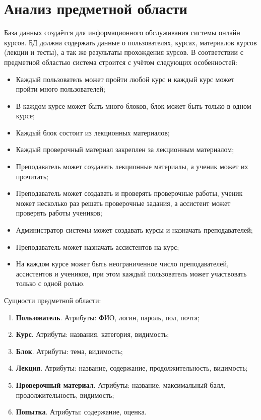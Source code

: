 \documentclass[a4paper,14pt]{article}
\begin{document}

\tableofcontents
\pagebreak

\section{Анализ предметной области}

База данных создаётся для информационного обслуживания системы онлайн курсов.
БД должна содержать данные о пользователях, курсах, материалов курсов (лекции и тесты), а так же результаты прохождения курсов.
В соответствии с предметной областью система строится с учётом следующих особенностей:

\begin{itemize}
	\item Каждый пользователь может пройти любой курс и каждый курс может пройти много пользователей;
	\item В каждом курсе может быть много блоков, блок может быть только в одном курсе;
	\item Каждый блок состоит из лекционных материалов;
	\item Каждый проверочный материал закреплен за лекционным материалом;
	\item Преподаватель может создавать лекционные материалы, а ученик может их прочитать;
	\item Преподаватель может создавать и проверять проверочные работы, ученик может несколько раз решать проверочные задания, а ассистент может проверять работы учеников;
	\item Администратор системы может создавать курсы и назначать преподавателей;
	\item Преподаватель может назначать ассистентов на курс;
	\item На каждом курсе может быть неограниченное число преподавателей, ассистентов и учеников, при этом каждый пользователь может участвовать только с одной ролью.	
\end{itemize}

Сущности предметной области:

\begin{enumerate}
	\item \textbf{Пользователь}. Атрибуты: ФИО, логин, пароль, пол, почта;
	\item \textbf{Курс}. Атрибуты: названия, категория, видимость;
	\item \textbf{Блок}. Атрибуты: тема, видимость;
	\item \textbf{Лекция}. Атрибуты: название, содержание, продолжительность, видимость;
	\item \textbf{Проверочный материал}. Атрибуты: название, максимальный балл, продолжительность, видимость;
	\item \textbf{Попытка}. Атрибуты: содержание, оценка.
\end{enumerate}
\end{document}
